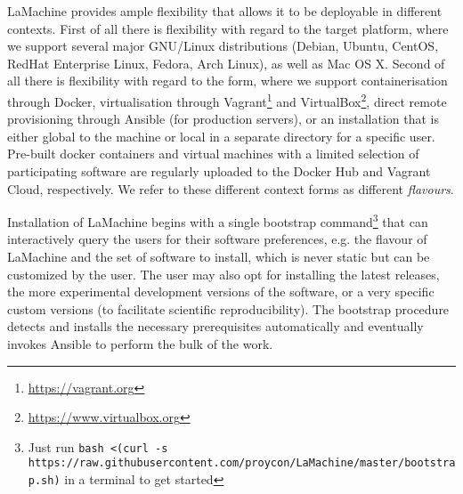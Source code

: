 \documentclass[a4paper,11pt]{article}
\begin{document}
LaMachine provides ample flexibility that allows it to be deployable in different contexts. First of all there is
flexibility with regard to the target platform, where we support several major GNU/Linux distributions (Debian, Ubuntu,
CentOS, RedHat Enterprise Linux, Fedora, Arch Linux), as well as Mac OS X. Second of all there is flexibility with
regard to the form, where we support containerisation through Docker, virtualisation through
Vagrant\footnote{\url{https://vagrant.org}} and VirtualBox\footnote{\url{https://www.virtualbox.org}},
direct remote provisioning through Ansible (for production servers), or an installation that is either global to the
machine or local in a separate directory for a specific user. Pre-built docker containers and virtual machines with a
limited selection of participating software are regularly uploaded to the Docker Hub and Vagrant Cloud, respectively. We
refer to these different context forms as different \emph{flavours}.

Installation of LaMachine begins with a single bootstrap command\footnote{Just run
\verb|bash <(curl -s https://raw.githubusercontent.com/proycon/LaMachine/master/bootstrap.sh)|
in a terminal to get started} that can
interactively query the users for their software preferences, e.g. the flavour of LaMachine and the set of software to
install, which is never static but can be customized by the user. The user may also opt for installing the latest
releases, the more experimental development versions of the software, or a very specific custom versions (to facilitate
scientific reproducibility). The bootstrap procedure detects and installs the necessary prerequisites automatically and
eventually invokes Ansible to perform the bulk of the work.
\end{document}
